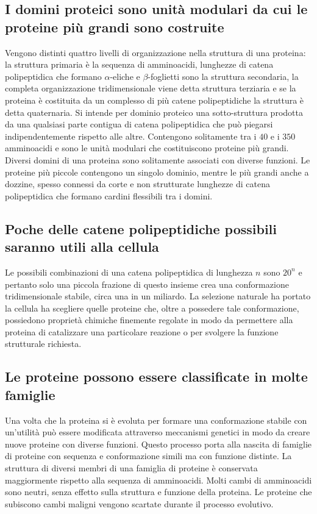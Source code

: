 \subsection{I domini proteici sono unit\`a modulari da cui le proteine pi\`u grandi sono costruite}
Vengono distinti quattro livelli di organizzazione nella struttura di una proteina: la struttura primaria \`e la sequenza di amminoacidi, lunghezze di
catena polipeptidica che formano $\alpha$-eliche e $\beta$-foglietti sono la struttura secondaria, la completa organizzazione tridimensionale viene
detta struttura terziaria e se la proteina \`e costituita da un complesso di pi\`u catene polipeptidiche la struttura \`e detta quaternaria. Si intende
per dominio proteico una sotto-struttura prodotta da una qualsiasi parte contigua di catena polipeptidica che pu\`o piegarsi indipendentemente rispetto 
alle altre. Contengono solitamente tra i $40$ e i $350$ amminoacidi e sono le unit\`a modulari che costituiscono proteine pi\`u grandi. Diversi domini di
una proteina sono solitamente associati con diverse funzioni. Le proteine pi\`u piccole contengono un singolo dominio, mentre le pi\`u grandi anche a
dozzine, spesso connessi da corte e non strutturate lunghezze di catena polipeptidica che formano cardini flessibili tra i domini.
\subsection{Poche delle catene polipeptidiche possibili saranno utili alla cellula} 
Le possibili combinazioni di una catena polipeptidica di lunghezza $n$ sono $20^n$ e pertanto solo una piccola frazione di questo insieme crea una conformazione tridimensionale stabile, 
circa una in un miliardo. La selezione naturale ha portato la cellula ha scegliere quelle proteine che, oltre a possedere tale conformazione, possiedono propriet\`a chimiche finemente
regolate in modo da permettere alla proteina di catalizzare una particolare reazione o per svolgere la funzione strutturale richiesta. 
\subsection{Le proteine possono essere classificate in molte famiglie}
Una volta che la proteina si \`e evoluta per formare una conformazione stabile con un'utilit\`a pu\`o essere modificata attraverso meccanismi genetici in modo da creare nuove proteine
con diverse funzioni. Questo processo porta alla nascita di famiglie di proteine con sequenza e conformazione simili ma con funzione distinte. La struttura di diversi membri di una 
famiglia di proteine \`e conservata maggiormente rispetto alla sequenza di amminoacidi. Molti cambi di amminoacidi sono neutri, senza effetto sulla struttura e funzione della proteina.
Le proteine che subiscono cambi maligni vengono scartate durante il processo evolutivo. 
